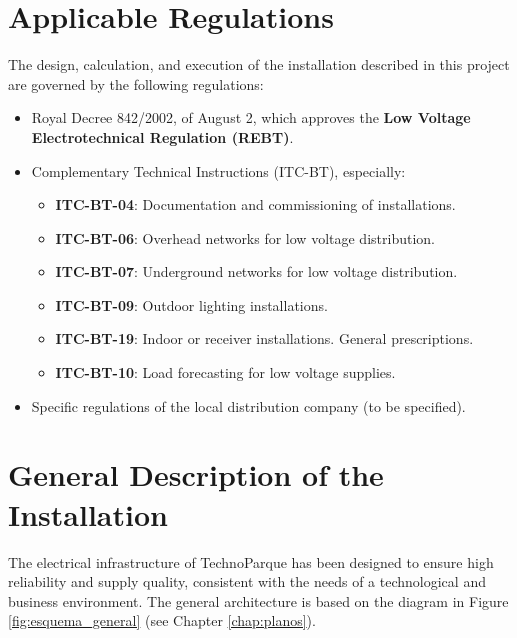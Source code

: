 \documentclass[12pt, a4paper]{report}
\begin{document}
\chapter{Applicable Regulations}
\label{chap:normativa}
The design, calculation, and execution of the installation described in this project are governed by the following regulations:
\begin{itemize}
    \item Royal Decree 842/2002, of August 2, which approves the \textbf{Low Voltage Electrotechnical Regulation (REBT)}.
    \item Complementary Technical Instructions (ITC-BT), especially:
    \begin{itemize}
        \item \textbf{ITC-BT-04}: Documentation and commissioning of installations.
        \item \textbf{ITC-BT-06}: Overhead networks for low voltage distribution.
        \item \textbf{ITC-BT-07}: Underground networks for low voltage distribution.
        \item \textbf{ITC-BT-09}: Outdoor lighting installations.
        \item \textbf{ITC-BT-19}: Indoor or receiver installations. General prescriptions.
        \item \textbf{ITC-BT-10}: Load forecasting for low voltage supplies.
    \end{itemize}
    \item Specific regulations of the local distribution company (to be specified).
\end{itemize}

\chapter{General Description of the Installation}
\label{chap:descripcion}
The electrical infrastructure of TechnoParque has been designed to ensure high reliability and supply quality, consistent with the needs of a technological and business environment. The general architecture is based on the diagram in Figure \ref{fig:esquema_general} (see Chapter \ref{chap:planos}).
\end{document}
